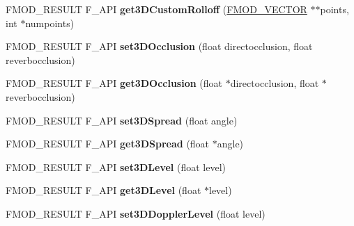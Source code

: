 \begin{DoxyCompactItemize}
\item 
\hypertarget{class_f_m_o_d_1_1_channel_control_af4cafc98f162dab49c4eb17ac547ec3e}{F\+M\+O\+D\+\_\+\+R\+E\+S\+U\+L\+T F\+\_\+\+A\+P\+I {\bfseries get3\+D\+Custom\+Rolloff} (\hyperlink{struct_f_m_o_d___v_e_c_t_o_r}{F\+M\+O\+D\+\_\+\+V\+E\+C\+T\+O\+R} $\ast$$\ast$points, int $\ast$numpoints)}\label{class_f_m_o_d_1_1_channel_control_af4cafc98f162dab49c4eb17ac547ec3e}

\item 
\hypertarget{class_f_m_o_d_1_1_channel_control_aec9d420c82b59c552ab46f53b99a92a4}{F\+M\+O\+D\+\_\+\+R\+E\+S\+U\+L\+T F\+\_\+\+A\+P\+I {\bfseries set3\+D\+Occlusion} (float directocclusion, float reverbocclusion)}\label{class_f_m_o_d_1_1_channel_control_aec9d420c82b59c552ab46f53b99a92a4}

\item 
\hypertarget{class_f_m_o_d_1_1_channel_control_ad4bfb501ccd002ccbb0d0925d4258ef8}{F\+M\+O\+D\+\_\+\+R\+E\+S\+U\+L\+T F\+\_\+\+A\+P\+I {\bfseries get3\+D\+Occlusion} (float $\ast$directocclusion, float $\ast$reverbocclusion)}\label{class_f_m_o_d_1_1_channel_control_ad4bfb501ccd002ccbb0d0925d4258ef8}

\item 
\hypertarget{class_f_m_o_d_1_1_channel_control_a12bba143567655a19886bdda772c60c6}{F\+M\+O\+D\+\_\+\+R\+E\+S\+U\+L\+T F\+\_\+\+A\+P\+I {\bfseries set3\+D\+Spread} (float angle)}\label{class_f_m_o_d_1_1_channel_control_a12bba143567655a19886bdda772c60c6}

\item 
\hypertarget{class_f_m_o_d_1_1_channel_control_a3b771f6762f3d472eda8d5e9e323f9c3}{F\+M\+O\+D\+\_\+\+R\+E\+S\+U\+L\+T F\+\_\+\+A\+P\+I {\bfseries get3\+D\+Spread} (float $\ast$angle)}\label{class_f_m_o_d_1_1_channel_control_a3b771f6762f3d472eda8d5e9e323f9c3}

\item 
\hypertarget{class_f_m_o_d_1_1_channel_control_a4ea9d36f487d6b0b41f1f9d64977c153}{F\+M\+O\+D\+\_\+\+R\+E\+S\+U\+L\+T F\+\_\+\+A\+P\+I {\bfseries set3\+D\+Level} (float level)}\label{class_f_m_o_d_1_1_channel_control_a4ea9d36f487d6b0b41f1f9d64977c153}

\item 
\hypertarget{class_f_m_o_d_1_1_channel_control_abeb7d638eb2599c22697eb1083a7cee7}{F\+M\+O\+D\+\_\+\+R\+E\+S\+U\+L\+T F\+\_\+\+A\+P\+I {\bfseries get3\+D\+Level} (float $\ast$level)}\label{class_f_m_o_d_1_1_channel_control_abeb7d638eb2599c22697eb1083a7cee7}

\item 
\hypertarget{class_f_m_o_d_1_1_channel_control_ac018af41cf8889e6ad76c7b9503e5300}{F\+M\+O\+D\+\_\+\+R\+E\+S\+U\+L\+T F\+\_\+\+A\+P\+I {\bfseries set3\+D\+Doppler\+Level} (float level)}\label{class_f_m_o_d_1_1_channel_control_ac018af41cf8889e6ad76c7b9503e5300}


\end{DoxyCompactItemize}
